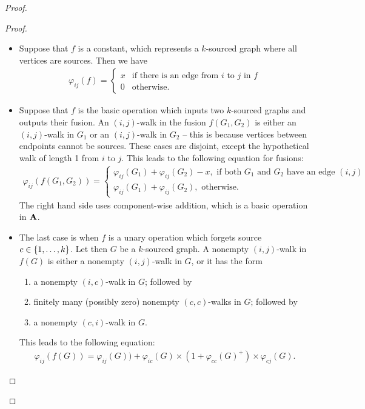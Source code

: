 \begin{proof}
\begin{proof}
            \begin{itemize}
                \item Suppose that $f$ is a constant, which represents a  $k$-sourced graph where all vertices are sources. Then we have 
                \begin{align*}
                \varphi_{ij}(f) = \begin{cases}
                    x & \text{if there is an edge from $i$ to $j$ in $f$}\\
                    0 & \text{otherwise.}
                \end{cases}
                \end{align*}
                \item Suppose that $f$ is the  basic operation which inputs two $k$-sourced graphs and outputs their fusion.  
                An $(i,j)$-walk in the fusion $f(G_1,G_2)$ is either an $(i,j)$-walk in $G_1$ or an $(i,j)$-walk in $G_2$ -- this is because vertices between endpoints cannot be sources. These cases are disjoint, except the hypothetical walk of length 1 from $i$ to $j$. %
  		This leads to the following equation for fusions:
                \begin{align*}
                \varphi_{ij}(f(G_1,G_2)) = \begin{cases}
                	\varphi_{ij}(G_1) + \varphi_{ij}(G_2) - x, \text{ if both $G_1$ and $G_2$ have an edge $(i, j)$}\\
                	\varphi_{ij}(G_1) + \varphi_{ij}(G_2), \text{ otherwise}.
                \end{cases}
                \end{align*}
                The right hand side uses component-wise addition, which is a basic operation in $\mathbf{A}$.
                \item The last case is when $f$ is a unary operation which forgets  source $c \in \{1,\ldots,k\}$.  Let then $G$ be a $k$-sourced graph. A nonempty $(i,j)$-walk in $f(G)$ is either a nonempty $(i,j)$-walk in $G$, or it has the form
                \begin{enumerate}
                    \item a nonempty $(i,c)$-walk in $G$; followed by 
                    \item finitely many (possibly zero) nonempty  $(c,c)$-walks in $G$; followed by
                    \item a nonempty $(c,i)$-walk in $G$.
                \end{enumerate}
                This leads to the following equation:
                \begin{align*}
                \varphi_{ij}(f(G)) = \varphi_{ij}(G)) +  \varphi_{ic}(G) \times (1+ \varphi_{cc}(G)^+)  \times \varphi_{cj}(G).
                \end{align*}                
            \end{itemize}
        \end{proof}
        
\end{proof}

